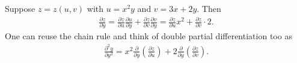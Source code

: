\begin{example}
    Suppose $z = z(u,v)$ with $u = x^{2}y$ and $v = 3x + 2y$. Then
    \begin{align}
        \frac{\partial z}{\partial y} = \frac{\partial z}{\partial u} \frac{\partial u}{\partial y} + \frac{\partial z}{\partial v} \frac{\partial v}{\partial y} = \frac{\partial z}{\partial u} x^{2} + \frac{\partial z}{\partial v} \cdot 2.
    \end{align}
    One can reuse the chain rule and think of double partial differentiation too as
    \begin{align}
        \frac{\partial^{2}y}{\partial y^{2}} = x^{2}\frac{\partial}{\partial y} \left( \frac{\partial z}{\partial u} \right) + 2 \frac{\partial}{\partial y} \left( \frac{\partial z}{\partial v} \right).
    \end{align}
\end{example}